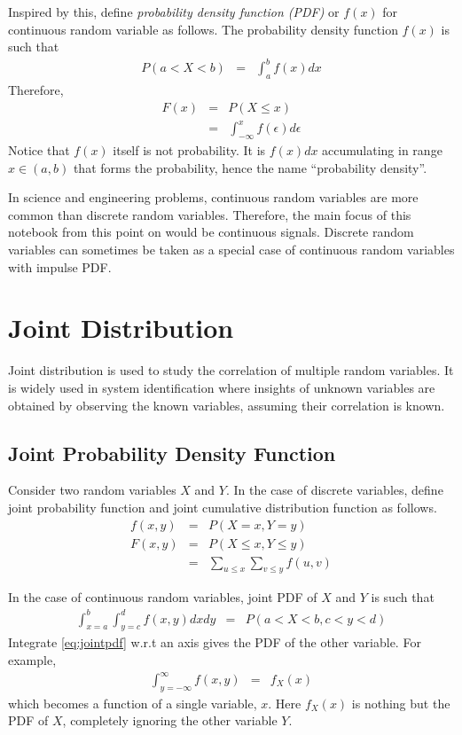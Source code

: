 Inspired by this, define \textit{probability density function (PDF)} or $f(x)$ for continuous random variable as follows. The probability density function $f(x)$ is such that
\begin{eqnarray}
  P(a < X < b) &=& \int_{a}^{b}f(x)dx \nonumber
\end{eqnarray}
Therefore,
\begin{eqnarray}
  F(x) &=& P(X\leq x) \nonumber \\
  &=& \int_{-\infty}^{x} f(\epsilon)d\epsilon \nonumber
\end{eqnarray}
Notice that $f(x)$ itself is not probability. It is $f(x)dx$ accumulating in range $x \in (a, b)$ that forms the probability, hence the name ``probability density''.

In science and engineering problems, continuous random variables are more common than discrete random variables. Therefore, the main focus of this notebook from this point on would be continuous signals. Discrete random variables can sometimes be taken as a special case of continuous random variables with impulse PDF.

\section{Joint Distribution}

Joint distribution is used to study the correlation of multiple random variables. It is widely used in system identification where insights of unknown variables are obtained by observing the known variables, assuming their correlation is known.

\subsection{Joint Probability Density Function}

Consider two random variables $X$ and $Y$. In the case of discrete variables, define joint probability function and joint cumulative distribution function as follows.
\begin{eqnarray}
  f(x, y) &=& P\left(X=x, Y=y\right) \nonumber \\
  F(x, y) &=& P\left(X\leq x, Y\leq y\right) \nonumber \\
  &=& \sum_{u\leq x}\sum_{v\leq y}f(u, v) \nonumber
\end{eqnarray}

In the case of continuous random variables, joint PDF of $X$ and $Y$ is such that
\begin{eqnarray}
  \int_{x=a}^{b}\int_{y=c}^{d} f(x, y) dxdy &=& P\left(a < X < b, c < y < d \right) \label{eq:jointpdf}
\end{eqnarray}
Integrate \eqref{eq:jointpdf} w.r.t an axis gives the PDF of the other variable. For example,
\begin{eqnarray}
  \int_{y=-\infty}^{\infty} f(x, y) &=& f_X(x) \label{eq:jointpdfdowngrade}
\end{eqnarray}
which becomes a function of a single variable, $x$. Here $f_X(x)$ is nothing but the PDF of $X$, completely ignoring the other variable $Y$.

